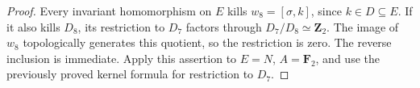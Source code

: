 \begin{proof}
Every invariant homomorphism on $E$ kills $w_8=[\sigma,k]$, since
$k\in D\subseteq E$. If it also kills $D_8$, its restriction to
$D_7$ factors through $D_7/D_8\simeq\mathbf Z_2$. The image of
$w_8$ topologically generates this quotient, so the restriction is
zero. The reverse inclusion is immediate. Apply this assertion
to $E=N$, $A=\mathbf F_2$, and use the previously proved kernel
formula for restriction to $D_7$.
\end{proof}


